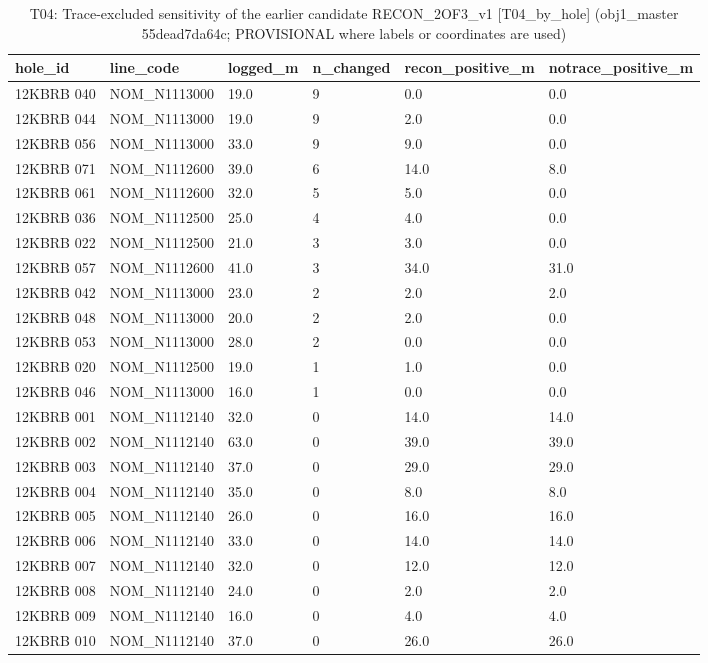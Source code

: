 \begin{table}[htbp]
\centering
\caption{T04: Trace-excluded sensitivity of the earlier candidate RECON\_2OF3\_v1 [T04\_by\_hole] (obj1\_master 55dead7da64c; PROVISIONAL where labels or coordinates are used)}
\begin{tabular}{llllll}
\toprule
hole\_id & line\_code & logged\_m & n\_changed & recon\_positive\_m & notrace\_positive\_m \\
\midrule
12KBRB 040 & NOM\_N1113000 & 19.0 & 9 & 0.0 & 0.0 \\
12KBRB 044 & NOM\_N1113000 & 19.0 & 9 & 2.0 & 0.0 \\
12KBRB 056 & NOM\_N1113000 & 33.0 & 9 & 9.0 & 0.0 \\
12KBRB 071 & NOM\_N1112600 & 39.0 & 6 & 14.0 & 8.0 \\
12KBRB 061 & NOM\_N1112600 & 32.0 & 5 & 5.0 & 0.0 \\
12KBRB 036 & NOM\_N1112500 & 25.0 & 4 & 4.0 & 0.0 \\
12KBRB 022 & NOM\_N1112500 & 21.0 & 3 & 3.0 & 0.0 \\
12KBRB 057 & NOM\_N1112600 & 41.0 & 3 & 34.0 & 31.0 \\
12KBRB 042 & NOM\_N1113000 & 23.0 & 2 & 2.0 & 2.0 \\
12KBRB 048 & NOM\_N1113000 & 20.0 & 2 & 2.0 & 0.0 \\
12KBRB 053 & NOM\_N1113000 & 28.0 & 2 & 0.0 & 0.0 \\
12KBRB 020 & NOM\_N1112500 & 19.0 & 1 & 1.0 & 0.0 \\
12KBRB 046 & NOM\_N1113000 & 16.0 & 1 & 0.0 & 0.0 \\
12KBRB 001 & NOM\_N1112140 & 32.0 & 0 & 14.0 & 14.0 \\
12KBRB 002 & NOM\_N1112140 & 63.0 & 0 & 39.0 & 39.0 \\
12KBRB 003 & NOM\_N1112140 & 37.0 & 0 & 29.0 & 29.0 \\
12KBRB 004 & NOM\_N1112140 & 35.0 & 0 & 8.0 & 8.0 \\
12KBRB 005 & NOM\_N1112140 & 26.0 & 0 & 16.0 & 16.0 \\
12KBRB 006 & NOM\_N1112140 & 33.0 & 0 & 14.0 & 14.0 \\
12KBRB 007 & NOM\_N1112140 & 32.0 & 0 & 12.0 & 12.0 \\
12KBRB 008 & NOM\_N1112140 & 24.0 & 0 & 2.0 & 2.0 \\
12KBRB 009 & NOM\_N1112140 & 16.0 & 0 & 4.0 & 4.0 \\
12KBRB 010 & NOM\_N1112140 & 37.0 & 0 & 26.0 & 26.0 \\

\end{tabular}
\end{table}
